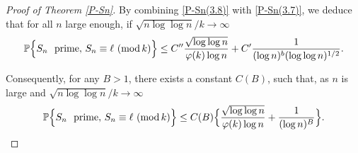 \documentclass[11pt,draft,reqno]{amsart}
\theoremstyle{definition}
\theoremstyle{remarks}
\numberwithin{equation}{section}
\def\P{{\mathcal P}}
\def\P{{\mathbb P}}
\begin{document}
\begin{proof}[Proof of Theorem \ref{P-Sn}]
By combining  \eqref{P-Sn(3.8)} with \eqref{P-Sn(3.7)}, we deduce that for all  $n$ large enough, if  $
\sqrt{ n  \log\log n}/k\to
\infty$ 
 $$ \P\Big\{S_n \  \hbox{ prime},\,  S_n\equiv \ell \ ({\rm mod}\, k)\Big\}\le  C''   {\sqrt{   
\log\log n}\over \varphi(k)\log    n   } + C'{  1\over (\log n)^{ b}(\log\log n)^{ 1/2} }.
 $$

Consequently, for any   $B>1$, there exists a constant $C(B)$, such that, as $n$ is large and  $
\sqrt{ n  \log\log n}/k\to
\infty$ 
$$ \P\Big\{S_n \  \hbox{ prime},\,  S_n\equiv \ell \ ({\rm mod}\, k)\Big\}\le C(B)\Big\{   {\sqrt{   
\log\log n}\over \varphi(k)\log    n   } +  {  1\over (\log n)^{B} }\Big\}.
 $$
 \end{proof}


































 
 
\end{document}
